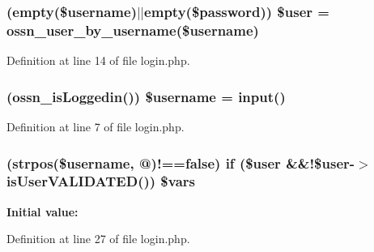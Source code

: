 \subsubsection[{\texorpdfstring{\$user}{$user}}]{ (empty(\${\bf username})$\vert$$\vert$empty(\${\bf password})) \${\bf user} = {\bf ossn\+\_\+user\+\_\+by\+\_\+username}(\${\bf username})}\hypertarget{actions_2user_2login_8php_a7cd1f50ebd490e28acaf45f2d0100209}{}\label{actions_2user_2login_8php_a7cd1f50ebd490e28acaf45f2d0100209}


Definition at line 14 of file login.\+php.

\subsubsection[{\texorpdfstring{\$username}{$username}}]{ ({\bf ossn\+\_\+is\+Loggedin}()) \${\bf username} = {\bf input}(\textquotesingle{})}\hypertarget{actions_2user_2login_8php_ae55aec6661bcbd0a1edbc7c356ad1fd4}{}\label{actions_2user_2login_8php_ae55aec6661bcbd0a1edbc7c356ad1fd4}


Definition at line 7 of file login.\+php.

\subsubsection[{\texorpdfstring{\$vars}{$vars}}]{ (strpos(\${\bf username}, \textquotesingle{}@\textquotesingle{})!==false) {\bf if} (\${\bf user} \&\&!\${\bf user}-\/$>$is\+User\+V\+A\+L\+I\+D\+A\+T\+ED()) \$vars}\hypertarget{actions_2user_2login_8php_a09d52a8b7d99079a3273ba277fa2d7cb}{}\label{actions_2user_2login_8php_a09d52a8b7d99079a3273ba277fa2d7cb}
{\bfseries Initial value\+:}


Definition at line 27 of file login.\+php.

